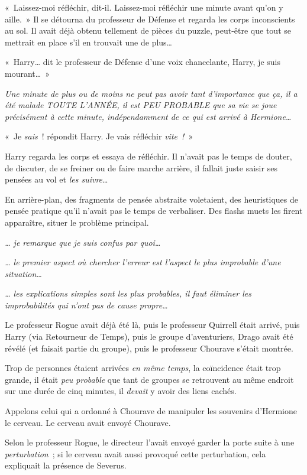 «~Laissez-moi réfléchir, dit-il. Laissez-moi réfléchir une minute avant qu'on y aille.~» Il se détourna du professeur de Défense et regarda les corps inconscients au sol. Il avait déjà obtenu tellement de pièces du puzzle, peut-être que tout se mettrait en place s'il en trouvait une de plus…

«~Harry… dit le professeur de Défense d'une voix chancelante, Harry, je suis mourant…~»

\emph{Une minute de plus ou de moins ne peut pas avoir tant d'importance que ça, il a été malade TOUTE L'ANNÉE, il est PEU PROBABLE que sa vie se joue précisément à cette minute, indépendamment de ce qui est arrivé à Hermione…}

«~Je \emph{sais}~! répondit Harry. Je vais réfléchir \emph{vite~!}~»

Harry regarda les corps et essaya de réfléchir. Il n'avait pas le temps de douter, de discuter, de se freiner ou de faire marche arrière, il fallait juste saisir ses pensées au vol et \emph{les suivre}…

En arrière-plan, des fragments de pensée abstraite voletaient, des heuristiques de pensée pratique qu'il n'avait pas le temps de verbaliser. Des flashs muets les firent apparaître, situer le problème principal.

\emph{… je remarque que je suis confus par quoi…}

\emph{… le premier aspect où chercher l'erreur est l'aspect le plus improbable d'une situation…}

\emph{… les explications simples sont les plus probables, il faut éliminer les improbabilités qui n'ont pas de cause propre…}

Le professeur Rogue avait déjà été là, puis le professeur Quirrell était arrivé, puis Harry (via Retourneur de Temps), puis le groupe d'aventuriers, Drago avait été révélé (et faisait partie du groupe), puis le professeur Chourave s'était montrée.

Trop de personnes étaient arrivées \emph{en même temps}, la coïncidence était trop grande, il était \emph{peu probable} que tant de groupes se retrouvent au même endroit sur une durée de cinq minutes, il \emph{devait} y avoir des liens cachés.

Appelons celui qui a ordonné à Chourave de manipuler les souvenirs d'Hermione le cerveau. Le cerveau avait envoyé Chourave.

Selon le professeur Rogue, le directeur l'avait envoyé garder la porte suite à une \emph{perturbation}~; si le cerveau avait aussi provoqué cette perturbation, cela expliquait la présence de Severus.

